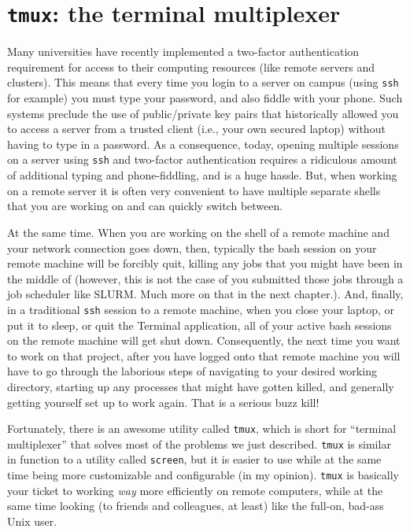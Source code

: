 \documentclass[]{krantz}
\begin{document}
\hypertarget{tmux}{%
\section{\texorpdfstring{\texttt{tmux}: the terminal multiplexer}{tmux: the terminal multiplexer}}\label{tmux}}

Many universities have recently implemented a two-factor
authentication requirement for access to their computing resources
(like remote servers and clusters). This means that every time
you login to a server on campus (using \texttt{ssh} for example) you must
type your password, and also fiddle with your phone. Such systems
preclude the use of public/private key pairs that historically allowed
you to access a server from a trusted client (i.e., your own secured
laptop) without having to type in a password. As a consequence, today,
opening multiple sessions on a server using \texttt{ssh} and two-factor
authentication requires a ridiculous amount of additional typing and
phone-fiddling, and is a huge hassle. But, when working on a remote
server it is often very convenient to have multiple separate shells that
you are working on and can quickly switch between.

At the same time. When you are working on the shell of a remote machine
and your network connection goes down, then, typically the bash session on
your remote machine will be forcibly quit, killing any jobs that you might
have been in the middle of (however, this is not the case of you submitted
those jobs through a job scheduler like SLURM. Much more on that in the
next chapter.). And, finally, in a traditional
\texttt{ssh} session to a remote machine, when you close your laptop, or put it
to sleep, or quit the Terminal application, all of your active bash sessions
on the remote machine will get shut down. Consequently, the next time
you want to work on that project, after you have logged
onto that remote machine you will have to go through the laborious steps
of navigating to your desired working directory, starting up any processes
that might have gotten killed, and generally getting yourself
set up to work again. That is a serious buzz kill!

Fortunately, there is an awesome utility called \texttt{tmux}, which is short for
``terminal multiplexer'' that solves most of the problems we just described.
\texttt{tmux} is similar in function to a utility called \texttt{screen}, but it is easier
to use while at the same time being more customizable and configurable
(in my opinion). \texttt{tmux} is basically your ticket to working \emph{way} more
efficiently on remote computers, while at the same time looking
(to friends and colleagues, at least) like
the full-on, bad-ass Unix user.
\end{document}
